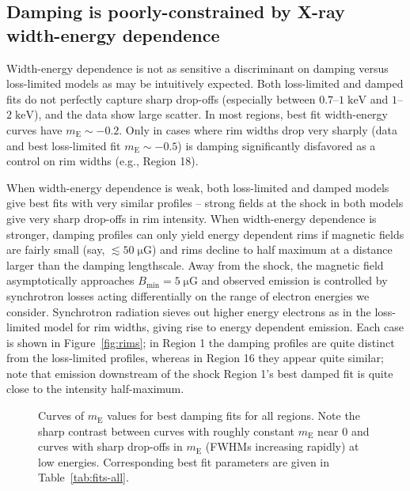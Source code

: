 \documentclass[iop, apj, numberedappendix]{emulateapj}
\newcommand*{\mt}{\mathrm}
\newcommand*{\unit}[1]{\;\mt{#1}}  %
\newcommand*{\mE}{m_\mt{E}}
\newcommand*{\muG}{\unit{\mu G}}
\begin{document}
\subsection{Damping is poorly-constrained by X-ray width-energy dependence}
\label{sec:damp-fit-disc}

Width-energy dependence is not as sensitive a discriminant on damping versus
loss-limited models as may be intuitively expected.  Both loss-limited and
damped fits do not perfectly capture sharp drop-offs (especially between
$0.7$--$1 \unit{keV}$ and $1$--$2 \unit{keV}$), and the data show large
scatter.  In most regions, best fit width-energy curves have $\mE \sim -0.2$.
Only in cases where rim widths drop very sharply (data and best loss-limited
fit $\mE \sim -0.5$) is damping significantly disfavored as a control on rim
widths (e.g., Region 18).

When width-energy dependence is weak, both loss-limited and damped models give
best fits with very similar profiles -- strong fields at the shock in both models
give very sharp drop-offs in rim intensity.  When width-energy dependence is
stronger, damping profiles can only yield energy dependent rims if magnetic
fields are fairly small (say, $\lesssim 50 \muG$) and rims decline to half
maximum at a distance larger than the damping lengthscale.  Away from the
shock, the magnetic field asymptotically approaches $B_{\mt{min}} = 5 \muG$ and
observed emission is controlled by synchrotron losses acting differentially on
the range of electron energies we consider.  Synchrotron radiation sieves out
higher energy electrons as in the loss-limited model for rim widths, giving
rise to energy dependent emission.  Each case is shown in
Figure~\ref{fig:rims}; in Region 1 the damping profiles are quite distinct from
the loss-limited profiles, whereas in Region 16 they appear quite similar; note
that emission downstream of the shock Region 1's best damped fit is quite close
to the intensity half-maximum.

\begin{figure}
    \centering
    \iftoggle{manuscript}{
        \texttt{[image: figures/mE-damp.pdf]}
    }{
        \plotone{figures/mE-damp.pdf}
    }
    \caption{Curves of $\mE$ values for best damping fits for all regions.
        Note the sharp contrast between curves with roughly constant $\mE$ near
        $0$ and curves with sharp drop-offs in $\mE$ (FWHMs increasing rapidly)
        at low energies. Corresponding best fit parameters are given in
        Table~\ref{tab:fits-all}. \label{fig:mE}}
\end{figure}
\end{document}
